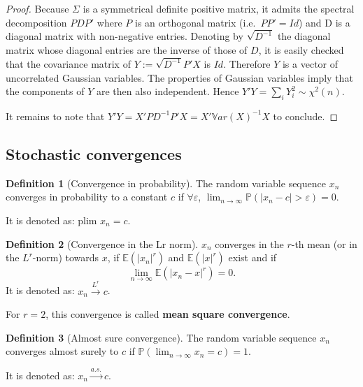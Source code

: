 \documentclass[
  12pt,
]{book}
\theoremstyle{definition}
\newtheorem{definition}{Definition}[chapter]
\theoremstyle{definition}
\theoremstyle{definition}
\theoremstyle{definition}
\theoremstyle{remark}
\begin{document}
\begin{proof}
Because \(\Sigma\) is a symmetrical definite positive matrix, it admits the spectral decomposition \(PDP'\) where \(P\) is an orthogonal matrix (i.e.~\(PP'=Id\)) and D is a diagonal matrix with non-negative entries. Denoting by \(\sqrt{D^{-1}}\) the diagonal matrix whose diagonal entries are the inverse of those of \(D\), it is easily checked that the covariance matrix of \(Y:=\sqrt{D^{-1}}P'X\) is \(Id\). Therefore \(Y\) is a vector of uncorrelated Gaussian variables. The properties of Gaussian variables imply that the components of \(Y\) are then also independent. Hence \(Y'Y=\sum_i Y_i^2 \sim \chi^2(n)\).

It remains to note that \(Y'Y=X'PD^{-1}P'X=X'\mathbb{V}ar(X)^{-1}X\) to conclude.
\end{proof}

\hypertarget{StochConvergences}{%
\subsection{Stochastic convergences}\label{StochConvergences}}

\begin{definition}[Convergence in probability]
\protect\hypertarget{def:convergenceproba}{}\label{def:convergenceproba}The random variable sequence \(x_n\) converges in probability to a constant \(c\) if \(\forall \varepsilon\), \(\lim_{n \rightarrow \infty} \mathbb{P}(|x_n - c|>\varepsilon) = 0\).

It is denoted as: \(\mbox{plim } x_n = c\).
\end{definition}

\begin{definition}[Convergence in the Lr norm]
\protect\hypertarget{def:convergenceLr}{}\label{def:convergenceLr}\(x_n\) converges in the \(r\)-th mean (or in the \(L^r\)-norm) towards \(x\), if \(\mathbb{E}(|x_n|^r)\) and \(\mathbb{E}(|x|^r)\) exist and if
\[
\lim_{n \rightarrow \infty} \mathbb{E}(|x_n - x|^r) = 0.
\]
It is denoted as: \(x_n \overset{L^r}{\rightarrow} c\).

For \(r=2\), this convergence is called \textbf{mean square convergence}.
\end{definition}

\begin{definition}[Almost sure convergence]
\protect\hypertarget{def:convergenceAlmost}{}\label{def:convergenceAlmost}The random variable sequence \(x_n\) converges almost surely to \(c\) if \(\mathbb{P}(\lim_{n \rightarrow \infty} x_n = c) = 1\).

It is denoted as: \(x_n \overset{a.s.}{\rightarrow} c\).
\end{definition}
\end{document}
